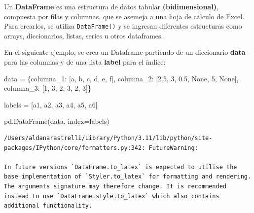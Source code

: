 \documentclass[
  letterpaper,
  DIV=11,
  numbers=noendperiod]{scrreprt}
\newenvironment{Shaded}{\begin{snugshade}}{\end{snugshade}}
\newcommand{\DecValTok}[1]{\textcolor[rgb]{0.68,0.00,0.00}{#1}}
\newcommand{\FloatTok}[1]{\textcolor[rgb]{0.68,0.00,0.00}{#1}}
\newcommand{\NormalTok}[1]{\textcolor[rgb]{0.00,0.23,0.31}{#1}}
\newcommand{\OperatorTok}[1]{\textcolor[rgb]{0.37,0.37,0.37}{#1}}
\newcommand{\StringTok}[1]{\textcolor[rgb]{0.13,0.47,0.30}{#1}}
\newcommand{\VariableTok}[1]{\textcolor[rgb]{0.07,0.07,0.07}{#1}}
\begin{document}
Un \textbf{DataFrame} es una estructura de datos tabular
\textbf{(bidimensional)}, compuesta por filas y columnas, que se asemeja
a una hoja de cálculo de Excel. Para crearlos, se utiliza
\texttt{DataFrame()} y se ingresan diferentes estructuras como arrays,
diccionarios, listas, series u otros dataframes.

En el siguiente ejemplo, se crea un Dataframe partiendo de un
diccionario \textbf{data} para las columnas y de una lista
\textbf{label} para el índice:

\begin{Shaded}
\begin{Highlighting}[]
\NormalTok{data }\OperatorTok{=}\NormalTok{ \{}\StringTok{\textquotesingle{}columna\_1\textquotesingle{}}\NormalTok{: [}\StringTok{\textquotesingle{}a\textquotesingle{}}\NormalTok{, }\StringTok{\textquotesingle{}b\textquotesingle{}}\NormalTok{, }\StringTok{\textquotesingle{}c\textquotesingle{}}\NormalTok{, }\StringTok{\textquotesingle{}d\textquotesingle{}}\NormalTok{, }\StringTok{\textquotesingle{}e\textquotesingle{}}\NormalTok{, }\StringTok{\textquotesingle{}f\textquotesingle{}}\NormalTok{],}
        \StringTok{\textquotesingle{}columna\_2\textquotesingle{}}\NormalTok{: [}\FloatTok{2.5}\NormalTok{, }\DecValTok{3}\NormalTok{, }\FloatTok{0.5}\NormalTok{, }\VariableTok{None}\NormalTok{, }\DecValTok{5}\NormalTok{, }\VariableTok{None}\NormalTok{],}
        \StringTok{\textquotesingle{}columna\_3\textquotesingle{}}\NormalTok{: [}\DecValTok{1}\NormalTok{, }\DecValTok{3}\NormalTok{, }\DecValTok{2}\NormalTok{, }\DecValTok{3}\NormalTok{, }\DecValTok{2}\NormalTok{, }\DecValTok{3}\NormalTok{]\}}

\NormalTok{labels }\OperatorTok{=}\NormalTok{ [}\StringTok{\textquotesingle{}a1\textquotesingle{}}\NormalTok{, }\StringTok{\textquotesingle{}a2\textquotesingle{}}\NormalTok{, }\StringTok{\textquotesingle{}a3\textquotesingle{}}\NormalTok{, }\StringTok{\textquotesingle{}a4\textquotesingle{}}\NormalTok{, }\StringTok{\textquotesingle{}a5\textquotesingle{}}\NormalTok{, }\StringTok{\textquotesingle{}a6\textquotesingle{}}\NormalTok{]}

\NormalTok{pd.DataFrame(data, index}\OperatorTok{=}\NormalTok{labels)}
\end{Highlighting}
\end{Shaded}

\begin{verbatim}
/Users/aldanarastrelli/Library/Python/3.11/lib/python/site-packages/IPython/core/formatters.py:342: FutureWarning:

In future versions `DataFrame.to_latex` is expected to utilise the base implementation of `Styler.to_latex` for formatting and rendering. The arguments signature may therefore change. It is recommended instead to use `DataFrame.style.to_latex` which also contains additional functionality.
\end{verbatim}
\end{document}
